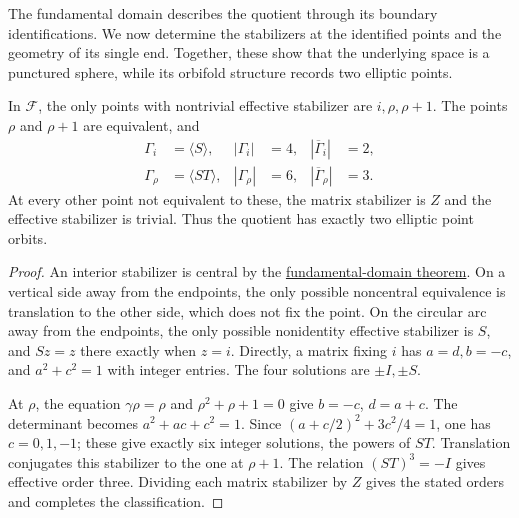 The fundamental domain describes the quotient through its boundary identifications. We now determine the stabilizers at the identified points and the geometry of its single end. Together, these show that the underlying space is a punctured sphere, while its orbifold structure records two elliptic points.

\begin{proposition}\label{modular.elliptic-stabilizers}
In $\mathcal F$, the only points with nontrivial effective stabilizer are $i,\rho,\rho+1$. The points $\rho$ and $\rho+1$ are equivalent, and
\[
 \begin{aligned}
 \Gamma_i&=\langle S\rangle,& |\Gamma_i|&=4,& |\overline\Gamma_i|&=2,\\
 \Gamma_\rho&=\langle ST\rangle,& |\Gamma_\rho|&=6,& |\overline\Gamma_\rho|&=3.
 \end{aligned}
\]
At every other point not equivalent to these, the matrix stabilizer is $Z$ and the effective stabilizer is trivial. Thus the quotient has exactly two elliptic point orbits.
\end{proposition}

\begin{proof}
An interior stabilizer is central by the \hyperref[modular.fundamental-domain]{fundamental-domain theorem}. On a vertical side away from the endpoints, the only possible noncentral equivalence is translation to the other side, which does not fix the point. On the circular arc away from the endpoints, the only possible nonidentity effective stabilizer is $S$, and $Sz=z$ there exactly when $z=i$. Directly, a matrix fixing $i$ has $a=d,b=-c$, and $a^2+c^2=1$ with integer entries. The four solutions are $\pm I,\pm S$.

At $\rho$, the equation $\gamma\rho=\rho$ and $\rho^2+\rho+1=0$ give $b=-c$, $d=a+c$. The determinant becomes $a^2+ac+c^2=1$. Since $(a+c/2)^2+3c^2/4=1$, one has $c=0,1,-1$; these give exactly six integer solutions, the powers of $ST$. Translation conjugates this stabilizer to the one at $\rho+1$. The relation $(ST)^3=-I$ gives effective order three. Dividing each matrix stabilizer by $Z$ gives the stated orders and completes the classification.
\end{proof}

